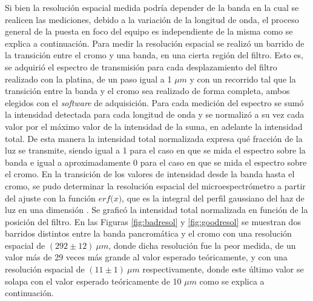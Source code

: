 Si bien la resolución espacial medida podría depender de la banda en la cual se realicen las mediciones, debido a la variación de la longitud de onda, el proceso general de la puesta en foco del equipo es independiente de la misma como se explica a continuación. Para medir la resolución espacial se realizó un barrido de la transición entre el cromo y una banda, en una cierta región del filtro. Esto es, se adquirió el espectro de transmisión para cada desplazamiento del filtro realizado con la platina, de un paso igual a 1 $\mu m$ y con un recorrido tal que la transición entre la banda y el cromo sea realizado de forma completa, ambos elegidos con el \textit{software} de adquisición. Para cada medición del espectro se sumó la intensidad detectada para cada longitud de onda y se normalizó a su vez cada valor por el máximo valor de la intensidad de la suma, en adelante la intensidad total. De esta manera la intensidad total normalizada expresa qué fracción de la luz se transmite, siendo igual a 1 para el caso en que se mida el espectro sobre la banda e igual a aproximadamente 0 para el caso en que se mida el espectro sobre el cromo. En la transición de los valores de intensidad desde la banda hasta el cromo, se pudo determinar la resolución espacial del microespectrómetro a partir del ajuste con la función $\textit{erf(x)}$, que es la integral del perfil gaussiano del haz de luz en una dimensión \cite{LASCH}. Se graficó la intensidad total normalizada en función de la posición del filtro. En las Figuras \ref{fig:badresol} y \ref{fig:goodresol} se muestran dos barridos distintos entre la banda pancromática y el cromo con una resolución espacial de $(292 \pm 12)~ \mu m$, donde dicha resolución fue la peor medida, de un valor más de 29 veces más grande al valor esperado teóricamente, y con una resolución espacial de $(11 \pm 1)~ \mu m$ respectivamente, donde este último valor se solapa con el valor esperado teóricamente de 10 $\mu m$ como se explica a continuación.

